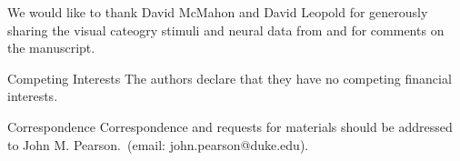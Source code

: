 \documentclass{nature}
\begin{document}



{}



\begin{addendum}
 \item We would like to thank David McMahon and David Leopold for generously sharing the visual cateogry stimuli and neural data from \cite{McMahon2014-qq} and for comments on the manuscript.
 \item[Competing Interests] The authors declare that they have no
competing financial interests.
 \item[Correspondence] Correspondence and requests for materials
should be addressed to John M. Pearson.~(email: john.pearson@duke.edu).
\end{addendum}





\end{document}
